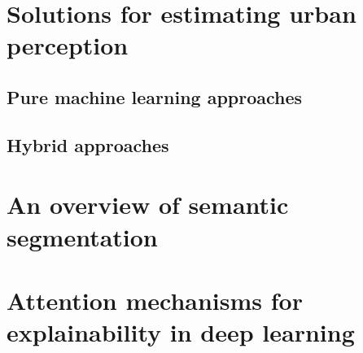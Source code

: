 \section{Solutions for estimating urban perception}

\subsection{Pure machine learning approaches}

\subsection{Hybrid approaches}

\section{An overview of semantic segmentation}

\section{ Attention mechanisms for explainability in deep learning}